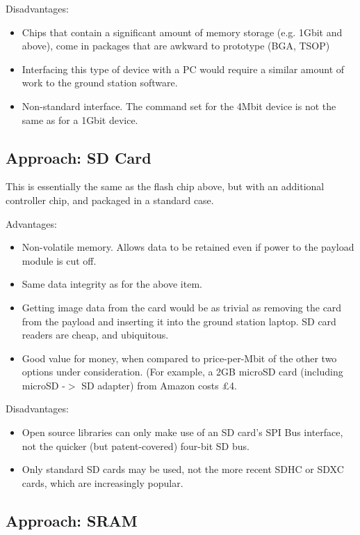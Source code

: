 Disadvantages:
\begin{itemize}
\item Chips that contain a significant amount of memory storage (e.g. 1Gbit 
and above), come in packages that are awkward to prototype (BGA, TSOP)
\item Interfacing this type of device with a PC would require a similar amount 
of work to the ground station software.
\item Non-standard interface. The command set for the 4Mbit device is not the 
same as for a 1Gbit device.
\end{itemize}



\subsection{Approach: SD Card}

This is essentially the same as the flash chip above, but with an additional controller chip, and packaged in a standard case.

Advantages:
\begin{itemize}
\item Non-volatile memory. Allows data to be retained even if power to the payload module is cut off.
\item Same data integrity as for the above item.
\item Getting image data from the card would be as trivial as removing the 
card from the payload and inserting it into the ground station laptop. SD card 
readers are cheap, and ubiquitous.
\item Good value for money, when compared to price-per-Mbit of the other two 
options under consideration. (For example, a 2GB microSD card (including 
microSD -$>$ SD adapter) from Amazon costs \pounds4.
\end{itemize}

Disadvantages:
\begin{itemize}
\item Open source libraries can only make use of an SD card's SPI Bus
interface, not the quicker (but patent-covered) four-bit SD bus.
\item Only standard SD cards may be used, not the more recent SDHC or SDXC 
cards, which are increasingly popular.
\end{itemize}

\subsection{Approach: SRAM}

